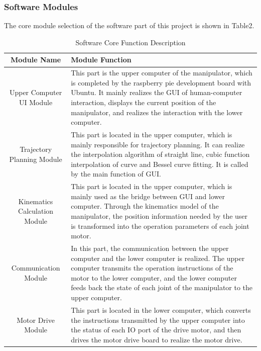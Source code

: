 \documentclass{hci}
\begin{document}
\subsubsection{Software Modules}
The core module selection of the software part of this project is shown in Table2.
\begin{table}[htbp] %
	\caption{Software Core Function Description} %
	\centering
	\label{t2}
	\begin{tabular}{c|p{9cm}} %
		\hline
		\hline
		Module Name& Module Function                                                                                                                                         \\
		\hline Upper Computer UI Module&This part is the upper computer of the manipulator, which is completed by the raspberry pie development board with Ubuntu. It mainly realizes the GUI of human-computer interaction, displays the current position of the manipulator, and realizes the interaction with the lower computer.\\
		\hline Trajectory Planning Module&This part is located in the upper computer, which is mainly responsible for trajectory planning. It can realize the interpolation algorithm of straight line, cubic function interpolation of curve and Bessel curve fitting. It is called by the main function of GUI.\\
		\hline	Kinematics Calculation Module&This part is located in the upper computer, which is mainly used as the bridge between GUI and lower computer. Through the kinematics model of the manipulator, the position information needed by the user is transformed into the operation parameters of each joint motor.\\
		\hline	Communication Module&In this part, the communication between the upper computer and the lower computer is realized. The upper computer transmits the operation instructions of the motor to the lower computer, and the lower computer feeds back the state of each joint of the manipulator to the upper computer.\\
		\hline	Motor Drive Module&This part is located in the lower computer, which converts the instructions transmitted by the upper computer into the status of each IO port of the drive motor, and then drives the motor drive board to realize the motor drive.\\
		\hline
	\end{tabular}
\end{table}
\end{document}
